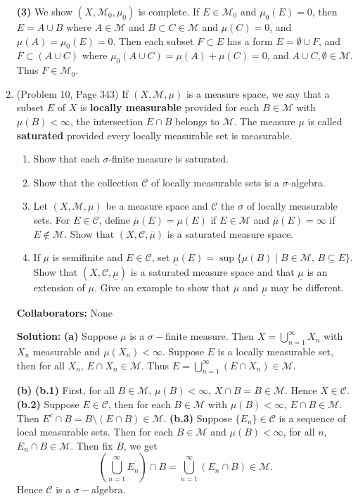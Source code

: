 \documentclass{article}%
\begin{document}
\begin{enumerate}
\textbf{(3)} We show $(X, \mathcal{M}_0, \mu_0)$ is complete. If $E\in\mathcal{M}_0$ and $\mu_0(E) = 0$, then $E = A\cup B$ where $A\in\mathcal{M}$ and $B\subset C\in \mathcal{M}$ and $\mu(C) = 0$, and $\mu(A) = \mu_0(E) = 0$. Then each subset $F\subset E$ has a form $E = \emptyset \cup F$, and $F\subset (A\cup C)$ where $\mu_0(A\cup C) = \mu(A)+\mu(C) = 0$, and $A\cup C, \emptyset \in \mathcal{M}$. Thus $F\in\mathcal{M}_0$. 


\bigskip


\item (Problem 10, Page 343) If $(X,\mathcal{M},\mu)$ is a measure space, we say that a subset $E$ of $X$ is \textbf{locally measurable} provided for each $B\in \mathcal{M}$ with $\mu(B)<\infty$, the intersection $E\cap B$ belongs to $\mathcal{M}$.  The measure $\mu$ is called \textbf{saturated} provided every locally measurable set is measurable.
\begin{enumerate}
\item Show that each $\sigma$-finite measure is saturated.
\item Show that the collection $\mathcal{C}$ of locally measurable sets is a $\sigma$-algebra.
\item Let $(X,\mathcal{M},\mu)$ be a measure space and $\mathcal{C}$ the $\sigma$ of locally measurable sets. For $E\in \mathcal{C}$, define $\overline{\mu}(E) = \mu(E)$ if $E\in \mathcal{M}$ and $\overline{\mu}(E) = \infty$ if $E\notin \mathcal{M}$.  Show that $(X,\mathcal{C},\overline{\mu})$ is a saturated measure space.
\item If $\mu$ is semifinite and $E\in \mathcal{C}$, set $\underline{\mu}(E)=\sup\{\mu(B)\mid B\in\mathcal{M},\, B\subseteq E \}$. Show that  $(X,\mathcal{C},\underline{\mu})$ is a saturated measure space and that $\underline{\mu}$ is an extension of $\mu$.  Give an example to show that $\overline{\mu}$ and $\underline{\mu}$ may be different.
\end{enumerate}


\bigskip
\textbf{Collaborators:} None
\smallskip
 
\textbf{Solution:}
\textbf{(a)} Suppose $\mu$ is a $\sigma-$finite measure. Then $X = \bigcup\limits_{n=1}^{\infty}X_n $ with $X_n$ measurable and $\mu(X_n) < \infty$. Suppose $E$ is a locally measurable set, then for all $X_n$, $E\cap X_n \in\mathcal{M}$. Thus $E = \bigcup\limits_{n=1}^{\infty}(E\cap X_n) \in\mathcal{M}$.

\textbf{(b)} \textbf{(b.1)} First, for all $B\in\mathcal{M}$, $\mu(B) < \infty$, $X\cap B = B\in\mathcal{M}$. Hence $X\in \mathcal{C}$. 
\textbf{(b.2)} Suppose $E\in\mathcal{C}$, then for each $B\in\mathcal{M}$ with $\mu(B) < \infty$, $E\cap B \in\mathcal{M}$. Then $E^c\cap B = B\setminus (E\cap B) \in\mathcal{M}$.
\textbf{(b.3)} Suppose $\{E_n\}\in \mathcal{C}$ is a sequence of local measurable sets. Then for each $B\in\mathcal{M}$ and $\mu(B) < \infty$, for all $n$, $E_n\cap B\in\mathcal{M} $. Then fix $B$, we get
$$
\left(\bigcup_{n=1}^{\infty}E_n\right)\cap B = \bigcup_{n=1}^{\infty}(E_n\cap B)\in\mathcal{M}.
$$
Hence $\mathcal{C}$ is a $\sigma-$algebra.


\end{enumerate}
\end{document}
